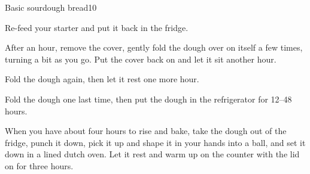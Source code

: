\documentclass{article}
\begin{document}
\begin{recipe}{Basic sourdough bread}{10}
    \begin{step}
      \begin{ingrs}
      \end{ingrs}
      \begin{stepdesc}
        Re-feed your starter and put it back in the fridge.
      \end{stepdesc}
    \end{step}
    \begin{step}
      \begin{ingrs}
      \end{ingrs}
      \begin{stepdesc}
        After an hour, remove the cover, gently fold the dough over on itself a few times, turning a bit as you go. Put the cover back on and let it sit another hour.
      \end{stepdesc}
    \end{step}
    \begin{step}
      \begin{ingrs}
      \end{ingrs}
      \begin{stepdesc}
        Fold the dough again, then let it rest one more hour.
      \end{stepdesc}
    \end{step}
    \begin{step}
      \begin{ingrs}
      \end{ingrs}
      \begin{stepdesc}
        Fold the dough one last time, then put the dough in the refrigerator for 12--48 hours.
      \end{stepdesc}
    \end{step}
    \begin{step}
      \begin{ingrs}
      \end{ingrs}
      \begin{stepdesc}
        When you have about four hours to rise and bake, take the dough out of the fridge, punch it down, pick it up and shape it in your hands into a ball, and set it down in a lined dutch oven. Let it rest and warm up on the counter with the lid on for three hours.
      \end{stepdesc}
    \end{step}
    \begin{step}

\end{step}
\end{recipe}
\end{document}
